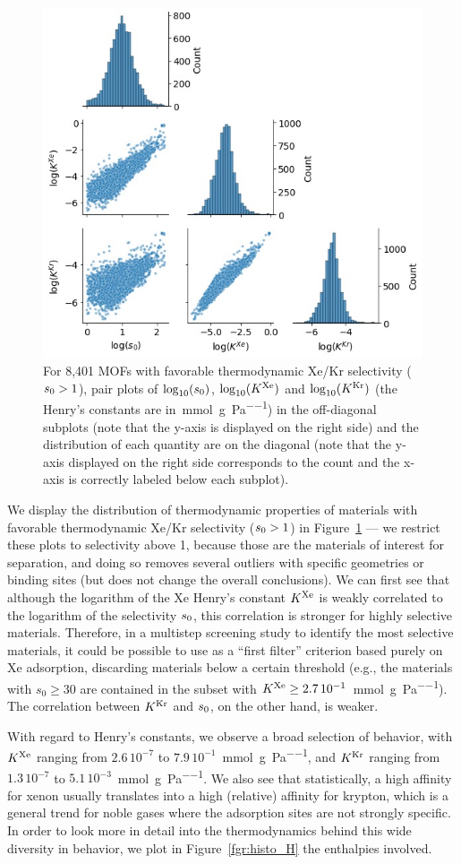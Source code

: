 \documentclass[main.tex]{subfiles}
\begin{document}
\begin{figure}[t]
\centering
  \includegraphics[width=0.6\linewidth]{figures/2-thermo/Henry_0.jpg}
  \caption{For 8,401 MOFs with favorable thermodynamic Xe/Kr selectivity ($s_{\text{0}} > 1$), pair plots of $\log_{\text{10}}(s_{\text{0}})$, $\log_{\text{10}}(K^{\text{Xe}})$ and $\log_{\text{10}}(K^{\text{Kr}})$ (the Henry's constants are in~\si{\milli\mol\per\gram\per\pascal}) in the off-diagonal subplots (note that the y-axis is displayed on the right side) and the distribution of each quantity are on the diagonal (note that the y-axis displayed on the right side corresponds to the count and the x-axis is correctly labeled below each subplot).}\label{fgr:histo_K}
\end{figure}


We display the distribution of thermodynamic properties of materials with favorable thermodynamic Xe/Kr selectivity ($s_{\text{0}} > 1$) in Figure~\ref{fgr:histo_K} --- we restrict these plots to selectivity above 1, because those are the materials of interest for separation, and doing so removes several outliers with specific geometries or binding sites (but does not change the overall conclusions). We can first see that although the logarithm of the Xe Henry's constant $K^{\text{Xe}}$ is weakly correlated to the logarithm of the selectivity $s_{\text{0}}$, this correlation is stronger for highly selective materials. Therefore, in a multistep screening study to identify the most selective materials, it could be possible to use as a ``first filter'' criterion based purely on Xe adsorption, discarding materials below a certain threshold (e.g., the materials with $s_0\ge30$ are contained in the subset with $K^{\text{Xe}}\ge2.7\,10^{-1}$~\si{\milli\mol\per\gram\per\pascal}). The correlation between $K^{\text{Kr}}$ and $s_{\text{0}}$, on the other hand, is weaker.

With regard to Henry's constants, we observe a broad selection of behavior, with $K^{\text{Xe}}$ ranging from $2.6\,10^{-7}$ to $7.9\,10^{-1}$~\si{\milli\mole\per\gram\per\pascal}, and $K^{\text{Kr}}$ ranging from $1.3\,10^{-7}$ to $5.1\,10^{-3}$~\si{\milli\mole\per\gram\per\pascal}. We also see that statistically, a high affinity for xenon usually translates into a high (relative) affinity for krypton, which is a general trend for noble gases where the adsorption sites are not strongly specific. In order to look more in detail into the thermodynamics behind this wide diversity in behavior, we plot in Figure~\ref{fgr:histo_H} the enthalpies involved.
\end{document}
